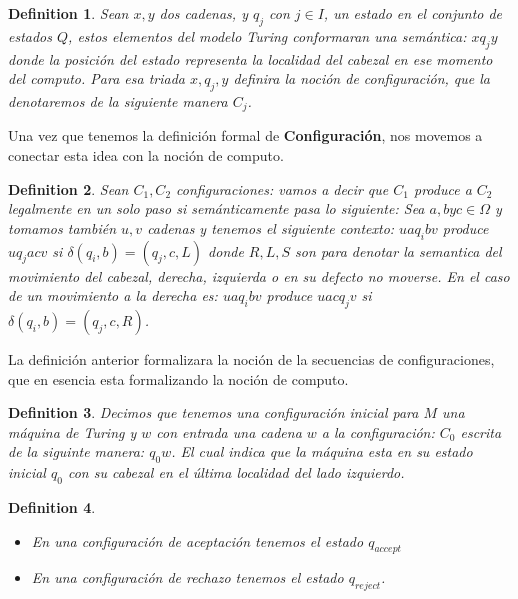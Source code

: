 \documentclass[10pt]{report}
\newtheorem{definition}{Definition}
\begin{document}
    \begin{definition}
        Sean $x,y$ dos cadenas, y $q_{j}$ con $j\in I$, un estado en el conjunto de estados $Q$,
        estos elementos del modelo Turing conformaran una semántica:
        $xq_{j}y$ donde la posición del estado representa la localidad del
        cabezal en ese momento del computo.
        Para esa triada $x,q_{j},y$ definira la noción de configuración,
        que la denotaremos de la siguiente manera $C_{j}$.
    \end{definition}

    Una vez que tenemos la definición formal de \textbf{Configuración},
    nos movemos a conectar esta idea con la noción de computo.
    \begin{definition}
        Sean $C_{1}, C_{2}$ configuraciones:\newline
        vamos a decir que $C_{1}$ produce a $C_{2}$  legalmente en un solo paso si semánticamente pasa
        lo siguiente:
        Sea $a,b y c \in \Omega$ y tomamos también $u,v$ cadenas y tenemos el
        siguiente contexto:
        $uaq_{i}bv$ produce $uq_{j}acv$ si $\delta(q_{i},b) = (q_{j},c,L)$
        donde $R,L,S$ son para denotar la semantica del movimiento del cabezal,
        derecha, izquierda o en su defecto no moverse.\newline
        En el caso de un movimiento a la derecha es:
        $uaq_{i}bv$ produce $uacq_{j}v$ si $\delta(q_{i},b) = (q_{j},c,R)$.

    \end{definition}
    \newline
    La definición anterior formalizara  la noción de la secuencias  de configuraciones, que en esencia
    esta formalizando la noción de computo.
    \space
    \begin{definition}
        Decimos que tenemos una configuración inicial para $M$ una máquina de Turing y $w$ con
        entrada una cadena $w$ a la configuración: $C_{0}$ escrita de la siguinte manera:
        $q_{0}w$.
        El cual indica que la máquina esta en su estado inicial $q_{0}$ con su cabezal en el última
        localidad del lado izquierdo.
    \end{definition}
    \begin{definition}
        \newline
        \begin{itemize}
            \item En una configuración de aceptación tenemos el estado $q_{accept}$
            \item En una configuración de rechazo tenemos el estado $q_{reject}$.
        \end{itemize}
    \end{definition}
\end{document}

